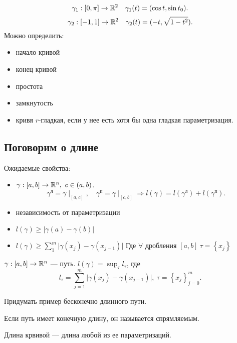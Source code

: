 \begin{ex}
\[
    \gamma_1: [0, \pi] \to  \mathbb{R}^2\quad \gamma_1(t) = (\cos t , \sin t_0)
.\] 
\[
    \gamma_2 : [-1, 1] \to  \mathbb{R}^2\quad \gamma_2(t) = (-t, \sqrt{1-t^2})
.\] 
Можно определить:
\begin{itemize}[noitemsep]
    \item начало кривой
    \item конец кривой
    \item простота
    \item замкнутость
    \item кривя $ r$-гладкая, если у нее есть хотя бы одна гладкая параметризация.
\end{itemize}
\end{ex}
\subsection{Поговорим о длине}
Ожидаемые свойства:
\begin{itemize}[noitemsep]
    \item $ \gamma : [a, b] \to  \mathbb{R}^{n}, ~ c \in  (a, b) $. 
	\[
	    \gamma^{л} = \gamma \mid_{[a, c]}, \quad \gamma^{п} = \gamma\mid_{[c, b]} \Longrightarrow l(\gamma) = l(\gamma^{л}) + l(\gamma^{п})
	.\] 
    \item независимость от параметризации
    \item $ l(\gamma) \ge  \lvert \gamma(a) - \gamma(b) \rvert $
    \item
	$ l(\gamma) \ge \sum_{1}^{m} \lvert \gamma(x_j) - \gamma(x_{j-1}) \rvert $
	Где $ \forall  \text{ дробления }[a, b] ~\tau = \left\{ x_j \right\}  $
\end{itemize}
\begin{defn}
$ \gamma: [a, b] \to  \mathbb{R}^{n} $ --- путь. $ l(\gamma) = \sup_{\tau} l_{\tau}$, где   
\[
    l_{\tau} = \sum_{j=1}^{m} \lvert \gamma(x_j) -\gamma(x_{j-1}) \rvert, ~ \tau =  \left\{ x_j \right\}_{j=0}^{m}  
.\] 
\end{defn}
\begin{prac}
    Придумать пример бесконечно длинного пути.
\end{prac}
\begin{defn}
    Если путь имеет конечную длину, он называется  спрямляемым.
\end{defn}
\begin{defn}
    {\sf Длина крвивой} --- длина любой из ее параметризаций.  
\end{defn}
